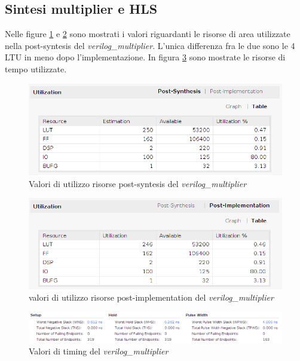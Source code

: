 \documentclass[]{IEEEtran}
\begin{document}
\subsection{Sintesi multiplier e HLS}
Nelle figure \ref{fig:UTIL_SYNT_VERILOG} e \ref{fig:UTIL_IMPL_VERILOG} sono mostrati i valori riguardanti le risorse di area utilizzate nella post-syntesis del \textit{verilog\_multiplier}. L'unica differenza fra le due sono le 4 LTU in meno dopo l'implementazione. In figura \ref{fig:TIMING_VERILOG} sono mostrate le risorse di tempo utilizzate.
\begin{figure}[!htb]
    \centering
    \includegraphics[width=0.9\linewidth]{figures/util_synt_verilog}
    \caption{Valori di utilizzo risorse post-syntesis del \textit{verilog\_multiplier}}
    \label{fig:UTIL_SYNT_VERILOG}
\end{figure}
\begin{figure}[!htb]
    \centering
    \includegraphics[width=0.9\linewidth]{figures/util_impl_verilog}
    \caption{valori di utilizzo risorse post-implementation del \textit{verilog\_multiplier}}
    \label{fig:UTIL_IMPL_VERILOG}
\end{figure}
\begin{figure}[!htb]
    \centering
    \includegraphics[width=1.0\linewidth]{figures/timing_verilog}
    \caption{Valori di timing del \textit{verilog\_multiplier}}
    \label{fig:TIMING_VERILOG}
\end{figure}
\end{document}

